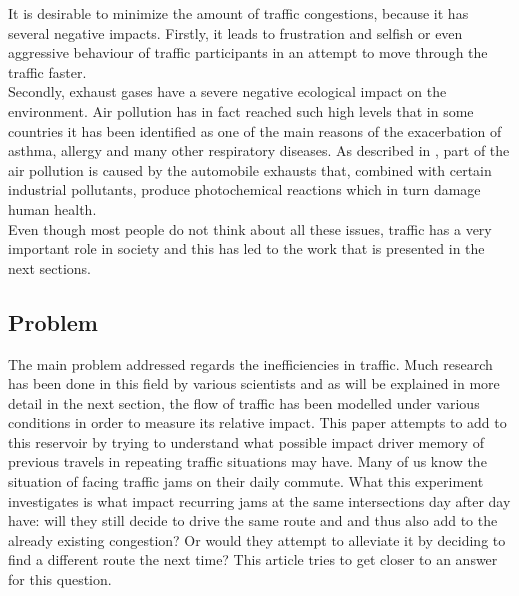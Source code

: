 \documentclass[a4paper,hidelinks]{article}
\begin{document}
It is desirable to minimize the amount of traffic congestions, because it has several negative impacts. Firstly, it leads to frustration and selfish or even aggressive behaviour of traffic participants in an attempt to move through the traffic faster. \\
Secondly, exhaust gases have a severe negative ecological impact on the environment. Air pollution has in fact reached such high levels that in some countries it has been identified as one of the main reasons of the exacerbation of asthma, allergy and many other respiratory diseases. As described in \cite{ghose2005assessment}, part of the air pollution is caused by the automobile exhausts that, combined with certain industrial pollutants, produce photochemical reactions which in turn damage human health. \\
Even though most people do not think about all these issues, traffic has a very important role in society and this has led to the work that is presented in the next sections.


\subsection{Problem}
The main problem addressed regards the inefficiencies in traffic. Much research has been done in this field by various scientists and as will be explained in more detail in the next section, the flow of traffic has been modelled under various conditions in order to measure its relative impact. This paper attempts to add to this reservoir by trying to understand what possible impact driver memory of previous travels in repeating traffic situations may have. Many of us know the situation of facing traffic jams on their daily commute. What this experiment investigates is what impact recurring jams at the same intersections day after day have: will they still decide to drive the same route and and thus also add to the already existing congestion? Or would they attempt to alleviate it by deciding to find a different route the next time? This article tries to get closer to an answer for this question.
\end{document}
